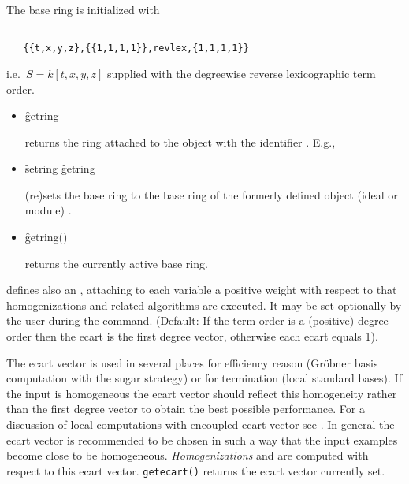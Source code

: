 The base ring is initialized with
\begin{verbatim}

   {{t,x,y,z},{{1,1,1,1}},revlex,{1,1,1,1}}
\end{verbatim}
i.e.\ $S=k[t,x,y,z]$ supplied with the degreewise reverse
lexicographic term order.
\begin{itemize}
\item[]
\begin{syntax}
    \f{getring} 
\end{syntax}
\hypertarget{operator:GETRING}{}
returns the ring attached to the object with the identifier
. E.g.,

\item[]
\begin{syntax}
    \f{setring} \f{getring} 
\end{syntax}
\hypertarget{operator:SETRING}{}
(re)sets the base ring to the base ring of the formerly defined
object (ideal or module) .

\item[]
  \begin{syntax}
    \f{getring}()
  \end{syntax}
returns the currently active base ring.
\end{itemize}

 defines also an , attaching to each variable a
positive weight with respect to that homogenizations and related
algorithms are executed. It may be set optionally by the user during
the  command.  (Default: If the term order is a
(positive) degree order then the ecart is the first degree vector,
otherwise each ecart equals 1).

The ecart vector is used in several places for efficiency reason (Gr\"obner
basis computation with the sugar strategy) or for termination (local
standard bases). If the input is homogeneous the ecart vector should
reflect this homogeneity rather than the first degree vector to
obtain the best possible performance. For a discussion of local
computations with encoupled ecart vector see \cite{Graebe:94}. In general
the ecart vector is recommended to be chosen in such a way that the
input examples become close to be homogeneous. \emph{Homogenizations}
and  are computed with respect to this ecart
vector.
\medskip
\hypertarget{operator:GETECART}{}
\texttt{getecart()}  returns the ecart vector
currently set.


